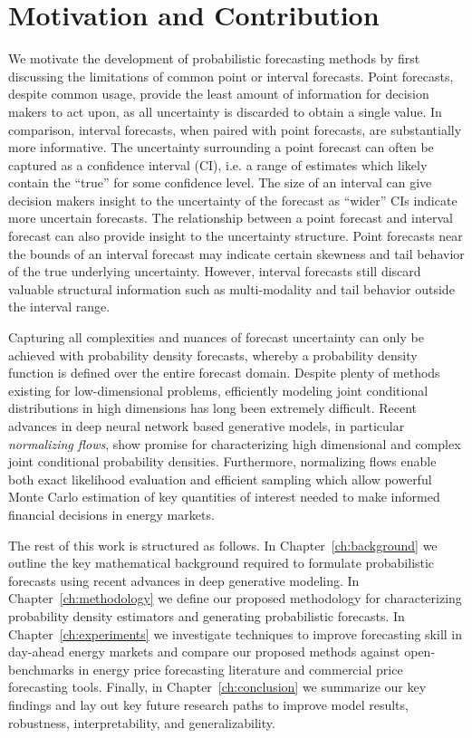 \section{Motivation and Contribution}\label{sec:motivation}

We motivate the development of probabilistic forecasting methods by first discussing the limitations of common
point or interval forecasts.
Point forecasts, despite common usage, provide the least amount of information for decision makers to act upon, as
all uncertainty is discarded to obtain a single value.
In comparison, interval forecasts, when paired with point forecasts, are substantially more informative.
The uncertainty surrounding a point forecast can often be captured as a confidence interval (CI), i.e. a range of
estimates which likely contain the ``true'' for some confidence level.
The size of an interval can give decision makers insight to the uncertainty of the forecast as ``wider'' CIs indicate
more uncertain forecasts.
The relationship between a point forecast and interval forecast can also provide insight to the uncertainty structure.
Point forecasts near the bounds of an interval forecast may indicate certain skewness and tail behavior of the true
underlying uncertainty.
However, interval forecasts still discard valuable structural information such as multi-modality and tail behavior
outside the interval range.

Capturing all complexities and nuances of forecast uncertainty can only be achieved with probability density forecasts,
whereby a probability density function is defined over the entire forecast domain.
Despite plenty of methods existing for low-dimensional problems, efficiently modeling joint conditional
distributions in high dimensions has long been extremely difficult.
Recent advances in deep neural network based generative models, in particular \textit{normalizing flows}, show promise
for characterizing high dimensional and complex joint conditional probability densities.
Furthermore, normalizing flows enable both exact likelihood evaluation and efficient sampling which allow powerful
Monte Carlo estimation of key quantities of interest needed to make informed financial decisions in energy markets.

The rest of this work is structured as follows.
In Chapter~\ref{ch:background} we outline the key mathematical background required to formulate probabilistic forecasts
using recent advances in deep generative modeling.
In Chapter~\ref{ch:methodology} we define our proposed methodology for characterizing probability density estimators
and generating probabilistic forecasts.
In Chapter~\ref{ch:experiments} we investigate techniques to improve forecasting skill in day-ahead energy markets and
compare our proposed methods against open-benchmarks in energy price forecasting literature and commercial price
forecasting tools.
Finally, in Chapter~\ref{ch:conclusion} we summarize our key findings and lay out key future research paths to improve
model results, robustness, interpretability, and generalizability.

